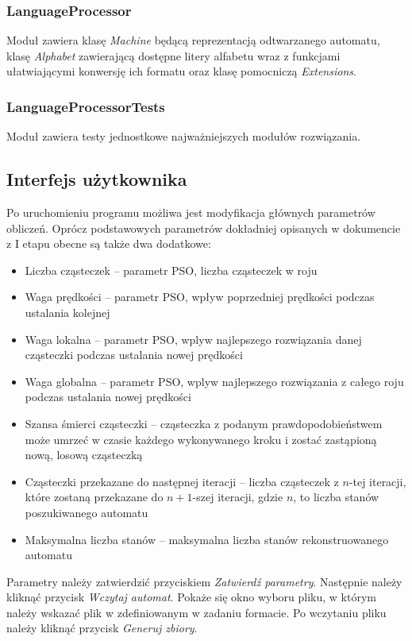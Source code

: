 \documentclass{../llncs_template_final/llncs}
\begin{document}
\subsubsection*{LanguageProcessor}
Moduł zawiera klasę \emph{Machine} będącą reprezentacją odtwarzanego automatu, klasę \emph{Alphabet} zawierającą dostępne litery alfabetu wraz z funkcjami ułatwiającymi konwersję ich formatu oraz klasę pomocniczą \emph{Extensions}.

\subsubsection*{LanguageProcessorTests}
Moduł zawiera testy jednostkowe najważniejszych modułów rozwiązania.

\subsection{Interfejs użytkownika}
Po uruchomieniu programu możliwa jest modyfikacja głównych parametrów obliczeń. Oprócz podstawowych parametrów dokładniej opisanych w dokumencie z I etapu obecne są także dwa dodatkowe:

\begin{itemize}
\item Liczba cząsteczek -- parametr PSO, liczba cząsteczek w roju
\item Waga prędkości -- parametr PSO, wpływ poprzedniej prędkości podczas ustalania kolejnej
\item Waga lokalna -- parametr PSO, wplyw najlepszego rozwiązania danej cząsteczki podczas ustalania nowej prędkości
\item Waga globalna -- parametr PSO, wplyw najlepszego rozwiązania z całego roju podczas ustalania nowej prędkości
\item Szansa śmierci cząsteczki -- cząsteczka z podanym prawdopodobieństwem może umrzeć w czasie każdego wykonywanego kroku i zostać zastąpioną nową, losową cząsteczką
\item Cząsteczki przekazane do następnej iteracji -- liczba cząsteczek z $n$-tej iteracji, które zostaną przekazane do $n+1$-szej iteracji, gdzie $n$, to liczba stanów poszukiwanego automatu
\item Maksymalna liczba stanów -- maksymalna liczba stanów rekonstruowanego automatu
\end{itemize}

Parametry należy zatwierdzić przyciskiem \emph{Zatwierdź parametry}. Następnie należy kliknąć przycisk \emph{Wczytaj automat}. Pokaże się okno wyboru pliku, w którym należy wskazać plik w zdefiniowanym w zadaniu formacie. Po wczytaniu pliku należy kliknąć przycisk \emph{Generuj zbiory}.
\end{document}
